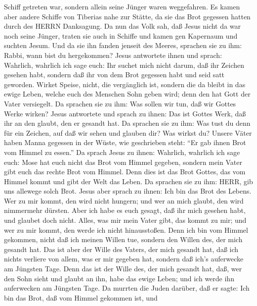 Schiff getreten war, sondern allein seine Jünger waren weggefahren.
 Es kamen aber andere Schiffe von Tiberias nahe zur Stätte,
da sie das Brot gegessen hatten durch des HERRN Danksagung.
 Da nun das Volk sah, daß Jesus nicht da war noch seine
Jünger, traten sie auch in Schiffe und kamen gen Kapernaum und suchten
Jesum.  Und da sie ihn fanden jenseit des Meeres, sprachen
sie zu ihm: Rabbi, wann bist du hergekommen?  Jesus
antwortete ihnen und sprach: Wahrlich, wahrlich ich sage euch: Ihr
suchet mich nicht darum, daß ihr Zeichen gesehen habt, sondern daß ihr
von dem Brot gegessen habt und seid satt geworden.  Wirket
Speise, nicht, die vergänglich ist, sondern die da bleibt in das ewige
Leben, welche euch des Menschen Sohn geben wird; denn den hat Gott der
Vater versiegelt.  Da sprachen sie zu ihm: Was sollen wir
tun, daß wir Gottes Werke wirken?  Jesus antwortete und
sprach zu ihnen: Das ist Gottes Werk, daß ihr an den glaubt, den er
gesandt hat.  Da sprachen sie zu ihm: Was tust du denn für
ein Zeichen, auf daß wir sehen und glauben dir? Was wirkst du?
 Unsere Väter haben Manna gegessen in der Wüste, wie
geschrieben steht: ``Er gab ihnen Brot vom Himmel zu essen.''
 Da sprach Jesus zu ihnen: Wahrlich, wahrlich ich sage
euch: Mose hat euch nicht das Brot vom Himmel gegeben, sondern mein
Vater gibt euch das rechte Brot vom Himmel.  Denn dies ist
das Brot Gottes, das vom Himmel kommt und gibt der Welt das Leben.
 Da sprachen sie zu ihm: HERR, gib uns allewege solch Brot.
 Jesus aber sprach zu ihnen: Ich bin das Brot des Lebens.
Wer zu mir kommt, den wird nicht hungern; und wer an mich glaubt, den
wird nimmermehr dürsten.  Aber ich habe es euch gesagt, daß
ihr mich gesehen habt, und glaubet doch nicht.  Alles, was
mir mein Vater gibt, das kommt zu mir; und wer zu mir kommt, den werde
ich nicht hinausstoßen.  Denn ich bin vom Himmel gekommen,
nicht daß ich meinen Willen tue, sondern den Willen des, der mich
gesandt hat.  Das ist aber der Wille des Vaters, der mich
gesandt hat, daß ich nichts verliere von allem, was er mir gegeben hat,
sondern daß ich's auferwecke am Jüngsten Tage.  Denn das
ist der Wille des, der mich gesandt hat, daß, wer den Sohn sieht und
glaubt an ihn, habe das ewige Leben; und ich werde ihn auferwecken am
Jüngsten Tage.  Da murrten die Juden darüber, daß er sagte:
Ich bin das Brot, daß vom Himmel gekommen ist,  und
